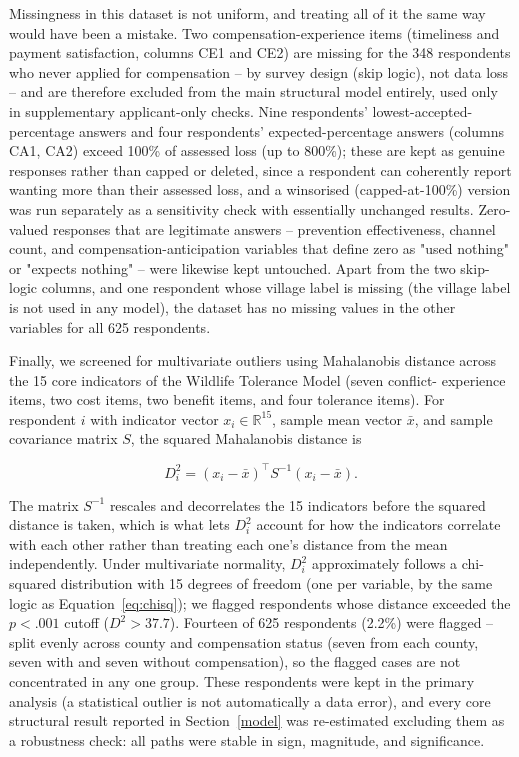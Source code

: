 Missingness in this dataset is not uniform, and treating all of it the same
way would have been a mistake. Two compensation-experience items (timeliness
and payment satisfaction, columns CE1 and CE2) are missing for the 348
respondents who never applied for compensation -- by survey design (skip
logic), not data loss -- and are therefore excluded from the main structural
model entirely, used only in supplementary applicant-only checks. Nine
respondents' lowest-accepted-percentage answers and four respondents'
expected-percentage answers (columns CA1, CA2) exceed 100\% of assessed loss
(up to 800\%); these are kept as genuine responses rather than capped or
deleted, since a respondent can coherently report wanting more than their
assessed loss, and a winsorised (capped-at-100\%) version was run separately
as a sensitivity check with essentially unchanged results. Zero-valued
responses that are legitimate answers -- prevention effectiveness, channel
count, and compensation-anticipation variables that define zero as "used
nothing" or "expects nothing" -- were likewise kept untouched. Apart from
the two skip-logic columns, and one respondent whose village label is
missing (the village label is not used in any model), the dataset has no
missing values in the other variables for all 625 respondents.

Finally, we screened for multivariate outliers using Mahalanobis distance
across the 15 core indicators of the Wildlife Tolerance Model (seven conflict-
experience items, two cost items, two benefit items, and four tolerance
items). For respondent $i$ with indicator vector $x_i \in \mathbb{R}^{15}$,
sample mean vector $\bar{x}$, and sample covariance matrix $S$, the squared
Mahalanobis distance is

\begin{equation}
D_i^2 = (x_i - \bar{x})^\top S^{-1} (x_i - \bar{x}).
\label{eq:mahalanobis}
\end{equation}

The matrix $S^{-1}$ rescales and decorrelates the 15 indicators before the
squared distance is taken, which is what lets $D_i^2$ account for how the
indicators correlate with each other rather than treating each one's
distance from the mean independently. Under multivariate normality, $D_i^2$
approximately follows a chi-squared distribution with 15 degrees of freedom
(one per variable, by the same logic as Equation~\ref{eq:chisq}); we
flagged respondents whose distance exceeded the $p < .001$ cutoff
($D^2 > 37.7$). Fourteen of 625 respondents (2.2\%) were
flagged -- split evenly across county and compensation status (seven from
each county, seven with and seven without compensation), so the flagged
cases are not concentrated in any one group. These respondents were kept in
the primary analysis (a statistical outlier is not automatically a data
error), and every core structural result reported in Section~\ref{model} was
re-estimated excluding them as a robustness check: all paths were stable in
sign, magnitude, and significance.
